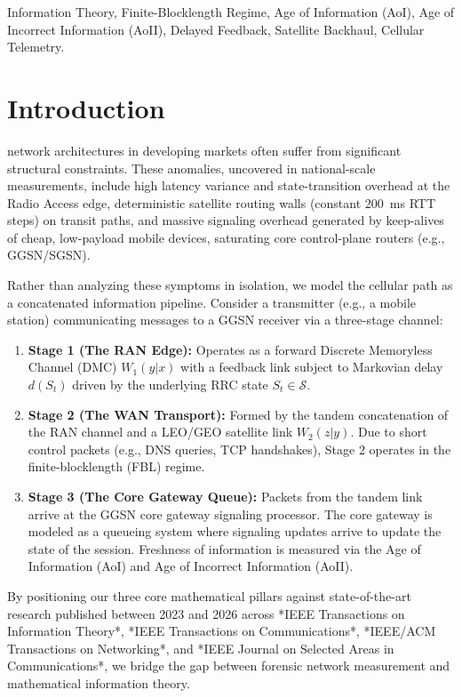 \documentclass[journal]{IEEEtran}
\begin{document}
\begin{IEEEkeywords}
Information Theory, Finite-Blocklength Regime, Age of Information (AoI), Age of Incorrect Information (AoII), Delayed Feedback, Satellite Backhaul, Cellular Telemetry.
\end{IEEEkeywords}

\section{Introduction}
 network architectures in developing markets often suffer from significant structural constraints. These anomalies, uncovered in national-scale measurements, include high latency variance and state-transition overhead at the Radio Access edge, deterministic satellite routing walls (constant 200~ms RTT steps) on transit paths, and massive signaling overhead generated by keep-alives of cheap, low-payload mobile devices, saturating core control-plane routers (e.g., GGSN/SGSN).

Rather than analyzing these symptoms in isolation, we model the cellular path as a concatenated information pipeline. Consider a transmitter (e.g., a mobile station) communicating messages to a GGSN receiver via a three-stage channel:
\begin{enumerate}
    \item \textbf{Stage 1 (The RAN Edge):} Operates as a forward Discrete Memoryless Channel (DMC) $W_1(y|x)$ with a feedback link subject to Markovian delay $d(S_t)$ driven by the underlying RRC state $S_t \in \mathcal{S}$.
    \item \textbf{Stage 2 (The WAN Transport):} Formed by the tandem concatenation of the RAN channel and a LEO/GEO satellite link $W_2(z|y)$. Due to short control packets (e.g., DNS queries, TCP handshakes), Stage 2 operates in the finite-blocklength (FBL) regime.
    \item \textbf{Stage 3 (The Core Gateway Queue):} Packets from the tandem link arrive at the GGSN core gateway signaling processor. The core gateway is modeled as a queueing system where signaling updates arrive to update the state of the session. Freshness of information is measured via the Age of Information (AoI) and Age of Incorrect Information (AoII).
\end{enumerate}

By positioning our three core mathematical pillars against state-of-the-art research published between 2023 and 2026 across *IEEE Transactions on Information Theory*, *IEEE Transactions on Communications*, *IEEE/ACM Transactions on Networking*, and *IEEE Journal on Selected Areas in Communications*, we bridge the gap between forensic network measurement and mathematical information theory.
\end{document}
